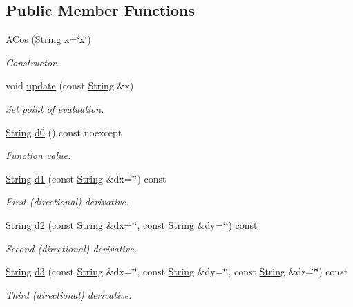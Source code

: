 \subsection*{Public Member Functions}
\begin{DoxyCompactItemize}
\item 
\hyperlink{structFunG_1_1stringify_1_1ACos_ab0b24f35d993d58894c4ea0fd0b25aac}{A\-Cos} (\hyperlink{structFunG_1_1String}{String} x=\char`\"{}x\char`\"{})
\begin{DoxyCompactList}\small\item\em Constructor. \end{DoxyCompactList}\item 
void \hyperlink{structFunG_1_1stringify_1_1ACos_aeee4c1fbb48feaf71285f5ff2743e5c5}{update} (const \hyperlink{structFunG_1_1String}{String} \&x)
\begin{DoxyCompactList}\small\item\em Set point of evaluation. \end{DoxyCompactList}\item 
\hyperlink{structFunG_1_1String}{String} \hyperlink{structFunG_1_1stringify_1_1ACos_a7c16822e86c5586ff0ea740ddcac5129}{d0} () const noexcept
\begin{DoxyCompactList}\small\item\em Function value. \end{DoxyCompactList}\item 
\hyperlink{structFunG_1_1String}{String} \hyperlink{structFunG_1_1stringify_1_1ACos_a239eb0696f73faf44d0c48bb02273bbe}{d1} (const \hyperlink{structFunG_1_1String}{String} \&dx=\char`\"{}\char`\"{}) const 
\begin{DoxyCompactList}\small\item\em First (directional) derivative. \end{DoxyCompactList}\item 
\hyperlink{structFunG_1_1String}{String} \hyperlink{structFunG_1_1stringify_1_1ACos_a031a630b936c3beb80f408e0d9ddf08f}{d2} (const \hyperlink{structFunG_1_1String}{String} \&dx=\char`\"{}\char`\"{}, const \hyperlink{structFunG_1_1String}{String} \&dy=\char`\"{}\char`\"{}) const 
\begin{DoxyCompactList}\small\item\em Second (directional) derivative. \end{DoxyCompactList}\item 
\hyperlink{structFunG_1_1String}{String} \hyperlink{structFunG_1_1stringify_1_1ACos_a94b8a0933d4e74561fde1a06b0269f2b}{d3} (const \hyperlink{structFunG_1_1String}{String} \&dx=\char`\"{}\char`\"{}, const \hyperlink{structFunG_1_1String}{String} \&dy=\char`\"{}\char`\"{}, const \hyperlink{structFunG_1_1String}{String} \&dz=\char`\"{}\char`\"{}) const 
\begin{DoxyCompactList}\small\item\em Third (directional) derivative. \end{DoxyCompactList}\end{DoxyCompactItemize}


